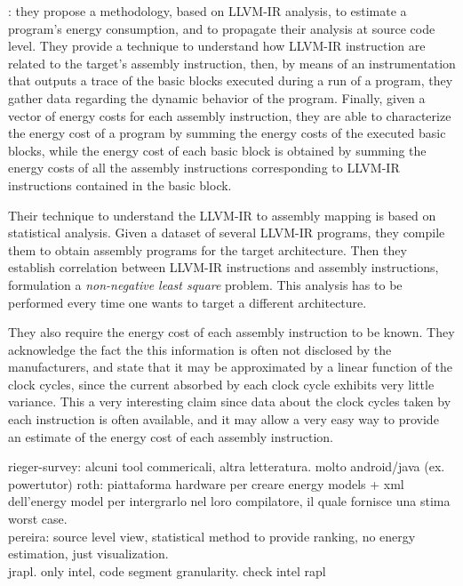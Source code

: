 \cite{brando2011}: they propose a methodology, based on LLVM-IR analysis, to estimate a program's energy consumption, and to propagate their analysis at source code level. They provide a technique to understand how LLVM-IR instruction are related to the target's assembly instruction, then, by means of an instrumentation that outputs a trace of the basic blocks executed during a run of a program, they gather data regarding the dynamic behavior of the program. Finally, given a vector of energy costs for each assembly instruction, they are able to characterize the energy cost of a program by summing the energy costs of the executed basic blocks, while the energy cost of each basic block is obtained by summing the energy costs of all the assembly instructions corresponding to LLVM-IR instructions contained in the basic block. \par 
Their technique to understand the LLVM-IR to assembly mapping is based on statistical analysis. Given a dataset of several LLVM-IR programs, they compile them to obtain assembly programs for the target architecture. Then they establish correlation between LLVM-IR instructions and assembly instructions, formulation a \emph{non-negative least square} problem. This analysis has to be performed every time one wants to target a different architecture. \par 
They also require the energy cost of each assembly instruction to be known. They acknowledge the fact the this information is often not disclosed by the manufacturers, and state that it may be approximated by a linear function of the clock cycles, since the  current absorbed by each clock cycle exhibits very little variance. This a very interesting claim since data about the clock cycles taken by each instruction is often available, and it may allow a very easy way to provide an estimate of the energy cost of each assembly instruction.


rieger-survey: alcuni tool commericali, altra letteratura. molto android/java (ex. powertutor)
roth: piattaforma hardware per creare energy models + xml dell'energy model per intergrarlo nel loro compilatore, il quale fornisce una stima worst case. \\
pereira: source level view, statistical method to provide ranking, no energy estimation, just visualization. \\
jrapl. only intel, code segment granularity. check intel rapl 


